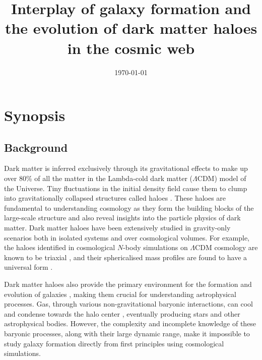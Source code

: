 \documentclass[a4paper, 12pt, oneside]{Thesis}  %
\begin{document}
\frontmatter      %

\title  {Interplay of galaxy formation and the evolution of dark matter haloes in the cosmic web}
\addresses  {\groupname\\\deptname\\\univname}  %
\date       {\today}
\subject    {}
\keywords   {}

\maketitle

\mainmatter	

\chapter*{Synopsis}

\section*{Background}

Dark matter is inferred exclusively through its gravitational effects to make up over 80\% of all the matter in the Lambda-cold dark matter ($\Lambda$CDM) model of the Universe. Tiny fluctuations in the initial density field cause them to clump into gravitationally collapsed structures called haloes \citep[][]{1974ApJ...187..425P,2002PhR...372....1C}. These haloes are fundamental to understanding cosmology as they form the building blocks of the large-scale structure and also reveal insights into the particle physics of dark matter. Dark matter haloes have been extensively studied in gravity-only scenarios both in isolated systems and over cosmological volumes. For example, the haloes identified in cosmological $N$-body simulations on $\Lambda$CDM cosmology are known to be triaxial \citep[][]{1988ApJ...327..507F}, and their sphericalised mass profiles are found to have a universal form \citep{1996ApJ...462..563N,1997ApJ...490..493N,2010MNRAS.402...21N}.

Dark matter haloes also provide the primary environment for the formation and evolution of galaxies \citep[e.g.,][]{wr78}, making them crucial for understanding astrophysical processes. Gas, through various non-gravitational baryonic interactions, can cool and condense towards the halo center \citep{1988MNRAS.234..459S,1998MNRAS.295..319M}, eventually producing stars and other astrophysical bodies. However, the complexity and incomplete knowledge of these baryonic processes, along with their large dynamic range, make it impossible to study galaxy formation directly from first principles using cosmological simulations.
\end{document}
